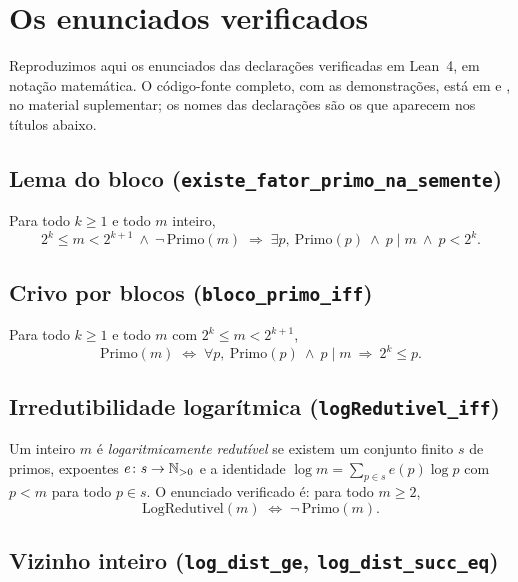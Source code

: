 \section{Os enunciados verificados}\label{ap:lean}

Reproduzimos aqui os enunciados das declarações verificadas em Lean~4, em notação
matemática. O código-fonte completo, com as demonstrações, está em
 e
, no material suplementar; os nomes das
declarações são os que aparecem nos títulos abaixo.

\subsection*{Lema do bloco (\texttt{existe\_fator\_primo\_na\_semente})}

\noindent Para todo $k\ge1$ e todo $m$ inteiro,
\[
  2^k \le m < 2^{k+1} \ \wedge\ \lnot\,\mathrm{Primo}(m)
  \;\Longrightarrow\;
  \exists p,\ \mathrm{Primo}(p)\ \wedge\ p\mid m\ \wedge\ p<2^k .
\]

\subsection*{Crivo por blocos (\texttt{bloco\_primo\_iff})}

\noindent Para todo $k\ge1$ e todo $m$ com $2^k\le m<2^{k+1}$,
\[
  \mathrm{Primo}(m)
  \;\Longleftrightarrow\;
  \forall p,\ \mathrm{Primo}(p)\ \wedge\ p\mid m \ \Rightarrow\ 2^k\le p .
\]

\subsection*{Irredutibilidade logarítmica (\texttt{logRedutivel\_iff})}

\noindent Um inteiro $m$ é \emph{logaritmicamente redutível} se existem um
conjunto finito $s$ de primos, expoentes $e\colon s\to\mathbb{N}_{>0}$ e a identidade
$\log m=\sum_{p\in s}e(p)\log p$ com $p<m$ para todo $p\in s$. O enunciado
verificado é: para todo $m\ge2$,
\[
  \mathrm{LogRedutivel}(m)
  \;\Longleftrightarrow\;
  \lnot\,\mathrm{Primo}(m).
\]

\subsection*{Vizinho inteiro (\texttt{log\_dist\_ge}, \texttt{log\_dist\_succ\_eq})}


